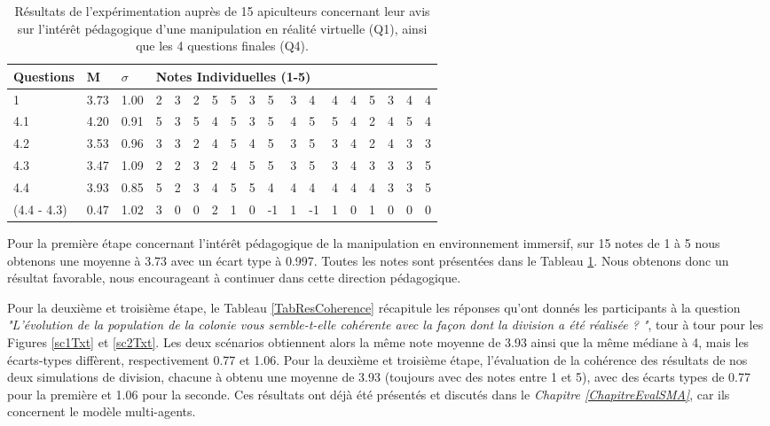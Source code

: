 	\begin{table}
	\centering
	\begin{tabular}{|l|l|l|lllllllllllllll|}
	\hline
	\textbf{Questions} & \textbf{M} & \textbf{$\sigma$} & \multicolumn{15}{l}{\textbf{Notes Individuelles (1-5)}}\\
	\hline
	1 & 3.73 & 1.00          &2&3&2&5&5&3&5&3&4&4&4&5&3&4&4\\
	\hline
	4.1 & 4.20 & 0.91        &5&3&5&4&5&3&5&4&5&5&4&2&4&5&4\\
	\hline
	4.2 & 3.53 & 0.96        &3&3&2&4&5&4&5&3&5&3&4&2&4&3&3\\
	\hline
	4.3 & 3.47 & 1.09        &2&2&3&2&4&5&5&3&5&3&4&3&3&3&5\\
	\hline
	4.4 & 3.93 & 0.85        &5&2&3&4&5&5&4&4&4&4&4&4&3&3&5\\
	\hline
	(4.4 - 4.3) & 0.47 & 1.02&3&0&0&2&1&0&-1&1&-1&1&0&1&0&0&0\\
	\hline
	\end{tabular}
	\caption{Résultats de l'expérimentation auprès de 15 apiculteurs concernant leur avis sur l'intérêt pédagogique d'une manipulation en réalité virtuelle (Q1), ainsi que les 4 questions finales (Q4).}
	\label{TabResVR}
	\end{table}	
	
	Pour la première étape concernant l'intérêt pédagogique de la manipulation en environnement immersif, sur 15 notes de 1 à 5 nous obtenons une moyenne à 3.73 avec un écart type à 0.997. Toutes les notes sont présentées dans le Tableau \ref{TabResVR}. Nous obtenons donc un résultat favorable, nous encourageant à continuer dans cette direction pédagogique.
	
    
	
	Pour la deuxième et troisième étape, le Tableau \ref{TabResCoherence} récapitule les réponses qu'ont donnés les participants à la question \textit{"L'évolution de la population de la colonie vous semble-t-elle cohérente avec la façon dont la division a été réalisée ? "}, tour à tour pour les Figures \ref{sc1Txt} et \ref{sc2Txt}. Les deux scénarios obtiennent alors la même note moyenne de 3.93 ainsi que la même médiane à 4, mais les écarts-types diffèrent, respectivement 0.77 et 1.06.
	Pour la deuxième et troisième étape, l'évaluation de la cohérence des résultats de nos deux simulations de division, chacune à obtenu une moyenne de 3.93 (toujours avec des notes entre 1 et 5), avec des écarts types de 0.77 pour la première et 1.06 pour la seconde. Ces résultats ont déjà été présentés et discutés dans le \textit{Chapitre \ref{ChapitreEvalSMA}}, car ils concernent le modèle multi-agents.
    
